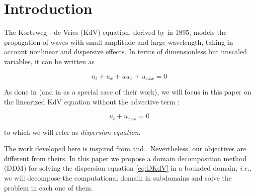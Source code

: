 \section{Introduction}

\indent The Korteweg - de Vries (KdV) equation, derived by \cite{kdv1895} in 1895, models the propagation of waves with small amplitude and large wavelength, taking in account nonlinear and dispersive effects. In terms of dimensionless but unscaled variables, it can be written as \cite{BBM1971}

\begin{equation*}
	u_t + u_x + uu_x + u_{xxx} = 0
\end{equation*}

\indent As done in \cite{zheng2008} (and in \cite{besse2015} as a special case of their work), we will focus in this paper on the linearized KdV equation without the advective term : 

\begin{equation}
 \label{eq:DKdV}
	u_t  + u_{xxx} = 0
\end{equation}

\noindent to which we will refer as \emph{dispersion equation}.

\indent The work developed here is inspired from \cite{zheng2008} and \cite{besse2015}. Nevertheless, our objectives are different from theirs. In this paper we propose a domain decomposition method (DDM) for solving the dispersion equation \eqref{eq:DKdV} in a bounded domain, \emph{i.e.}, we will decompose the computational domain in subdomains and solve the problem in each one of them. 



